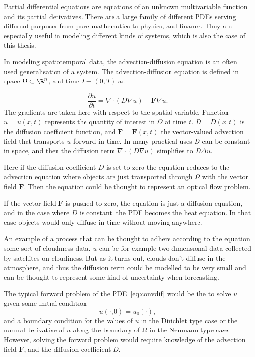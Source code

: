 Partial differential equations are equations of an unknown multivariable function and its partial derivatives.
There are a large family of different PDEs serving different purposes from pure mathematics to physics, and finance.
They are especially useful in modeling different kinds of systems, which is also the case of this thesis.

In modeling spatiotemporal data, the advection-diffusion equation is an often used generalisation of a system.
The advection-diffusion equation is defined in space $\Omega \subset \R^n$, and time $I = (0, T)$ as

\begin{equation}\label{eq:convdif}
    \frac{\partial u}{\partial t} = \nabla \cdot (D \nabla u) - \mathbf{F} \nabla u.
\end{equation}
The gradients are taken here with respect to the spatial variable.
Function $u = u(x,t)$ represents the quantity of interest in $\Omega$ at time $t$.
$D = D(x,t)$ is the diffusion coefficient function, and $\mathbf{F} = \mathbf{F}(x,t)$ the vector-valued advection field that transports $u$ forward in time.
In many practical uses $D$ can be constant in space, and then the diffusion term $\nabla \cdot (D \nabla u)$ simplifies to $D \Delta u$.

Here if the diffusion coefficient $D$ is set to zero the equation reduces to the advection equation where objects are just transported through $\Omega$ with the vector field $\mathbf{F}$.
Then the equation could be thought to represent an optical flow problem.

If the vector field $\mathbf{F}$ is pushed to zero, the equation is just a diffusion equation, and in the case where $D$ is constant, the PDE becomes the heat equation.
In that case objects would only diffuse in time without moving anywhere.

An example of a process that can be thought to adhere according to the equation some sort of cloudiness data.
$u$ can be for example two-dimensional data collected by satellites on cloudiness.
But as it turns out, clouds don't diffuse in the atmosphere, and thus the diffusion term could be modelled to be very small and can be thought to represent some kind of uncertainty when forecasting.

The typical forward problem of the PDE~\eqref{eq:convdif} would be the to solve $u$ given some initial condition
\begin{equation}
    u(\cdot, 0) = u_0(\cdot),
\end{equation}
and a boundary condition for the values of $u$ in the Dirichlet type case or the normal derivative of $u$ along the boundary of $\Omega$ in the Neumann type case.
However, solving the forward problem would require knowledge of the advection field $\mathbf{F}$, and the diffusion coefficient $D$.

